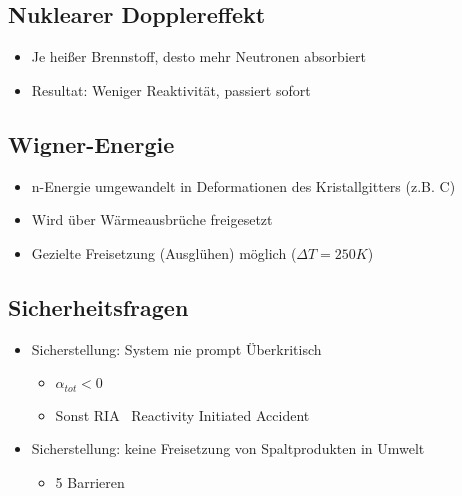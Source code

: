 \documentclass[12pt]{article}
\begin{document}
\subsection{Nuklearer Dopplereffekt}
\begin{itemize}
	\item Je heißer Brennstoff, desto mehr Neutronen absorbiert
	\item Resultat: Weniger Reaktivität, passiert sofort
\end{itemize}

\subsection{Wigner-Energie}
\begin{itemize}
	\item n-Energie umgewandelt in Deformationen des Kristallgitters (z.B. C)
	\item Wird über Wärmeausbrüche freigesetzt
	\item Gezielte Freisetzung (Ausglühen) möglich (\(\Delta T = 250K\))
\end{itemize}

\subsection{Sicherheitsfragen}
\begin{itemize}
	\item Sicherstellung: System nie prompt Überkritisch
		\begin{itemize}
			\item \(\alpha_{tot} < 0\)
			\item Sonst RIA \textrightarrow\ Reactivity Initiated Accident
		\end{itemize}
	\item Sicherstellung: keine Freisetzung von Spaltprodukten in Umwelt
		\begin{itemize}
			\item 5 Barrieren
		\end{itemize}
\end{itemize}
\end{document}
